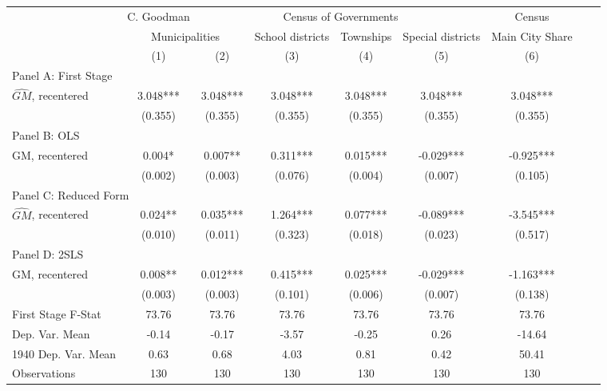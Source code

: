  \begin{tabular}{l*{8}{c}} \toprule
&\multicolumn{1}{c}{C. Goodman}&\multicolumn{4}{c}{Census of Governments}&\multicolumn{1}{c}{Census}\\\cmidrule(lr){2-2}\cmidrule(lr){3-6}\cmidrule(lr){7-7}
&\multicolumn{2}{c}{Municipalities}&\multicolumn{1}{c}{School districts}&\multicolumn{1}{c}{Townships}&\multicolumn{1}{c}{Special districts}&\multicolumn{1}{c}{Main City Share}\\\cmidrule(lr){2-3}\cmidrule(lr){4-6}\cmidrule(lr){7-7}
&\multicolumn{1}{c}{(1)}&\multicolumn{1}{c}{(2)}&\multicolumn{1}{c}{(3)}&\multicolumn{1}{c}{(4)}&\multicolumn{1}{c}{(5)}&\multicolumn{1}{c}{(6)}\\
\cmidrule(lr){1-7}
\multicolumn{6}{l}{Panel A: First Stage}\\
\cmidrule(lr){1-7}
$\widehat{GM}$, recentered&    3.048***&    3.048***&    3.048***&    3.048***&    3.048***&    3.048***\\
                &  (0.355)   &  (0.355)   &  (0.355)   &  (0.355)   &  (0.355)   &  (0.355)   \\
\cmidrule(lr){1-7}
\multicolumn{6}{l}{Panel B: OLS}\\
\cmidrule(lr){1-7}
GM, recentered  &    0.004*  &    0.007** &    0.311***&    0.015***&   -0.029***&   -0.925***\\
                &  (0.002)   &  (0.003)   &  (0.076)   &  (0.004)   &  (0.007)   &  (0.105)   \\
\cmidrule(lr){1-7}
\multicolumn{6}{l}{Panel C: Reduced Form}\\
\cmidrule(lr){1-7}
$\widehat{GM}$, recentered&    0.024** &    0.035***&    1.264***&    0.077***&   -0.089***&   -3.545***\\
                &  (0.010)   &  (0.011)   &  (0.323)   &  (0.018)   &  (0.023)   &  (0.517)   \\
\cmidrule(lr){1-7}
\multicolumn{6}{l}{Panel D: 2SLS}\\
\cmidrule(lr){1-7}
GM, recentered  &    0.008** &    0.012***&    0.415***&    0.025***&   -0.029***&   -1.163***\\
                &  (0.003)   &  (0.003)   &  (0.101)   &  (0.006)   &  (0.007)   &  (0.138)   \\
\midrule
First Stage F-Stat&    73.76   &    73.76   &    73.76   &    73.76   &    73.76   &    73.76   \\
Dep. Var. Mean  &    -0.14   &    -0.17   &    -3.57   &    -0.25   &     0.26   &   -14.64   \\
1940 Dep. Var. Mean&     0.63   &     0.68   &     4.03   &     0.81   &     0.42   &    50.41   \\
Observations    &      130   &      130   &      130   &      130   &      130   &      130   \\
       \bottomrule \end{tabular}
